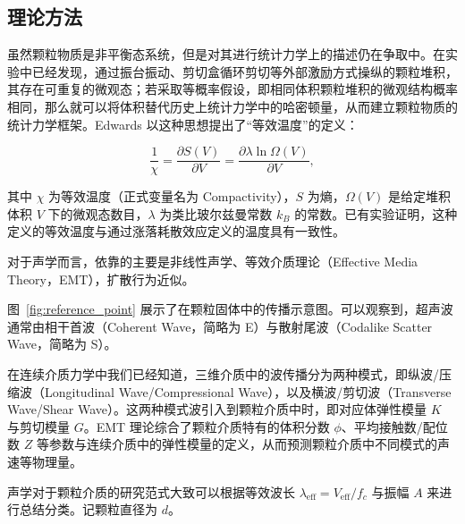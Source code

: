 \subsection{理论方法}

虽然颗粒物质是非平衡态系统，但是对其进行统计力学上的描述仍在争取中。在实验中已经发现，通过振台振动、剪切盒循环剪切等外部激励方式操纵的颗粒堆积，其存在可重复的微观态；若采取等概率假设，即相同体积颗粒堆积的微观结构概率相同，那么就可以将体积替代历史上统计力学中的哈密顿量，从而建立颗粒物质的统计力学框架。Edwards 以这种思想提出了“等效温度”的定义：

\begin{equation}
  \frac{1}{\chi} = \frac{\partial S(V)}{\partial V} = \frac{\partial \lambda\ln{\Omega(V)}}{\partial V},
\end{equation}

其中 $\chi$ 为等效温度（正式变量名为 Compactivity），$S$ 为熵，$\Omega(V)$ 是给定堆积体积 $V$ 下的微观态数目，$\lambda$ 为类比玻尔兹曼常数 $k_{B}$ 的常数。已有实验证明，这种定义的等效温度与通过涨落耗散效应定义的温度具有一致性。


对于声学而言，依靠的主要是非线性声学\cite{10.1029/93JB02974}、等效介质理论（Effective Media Theory，EMT），扩散行为近似。

图~\ref{fig:reference_point} 展示了在颗粒固体中的传播示意图。可以观察到，超声波通常由相干首波（Coherent Wave，简略为 E）与散射尾波（Codalike Scatter Wave，简略为 S）。 %

在连续介质力学中我们已经知道，三维介质中的波传播分为两种模式，即纵波/压缩波（Longitudinal Wave/Compressional Wave），以及横波/剪切波（Transverse Wave/Shear Wave）。这两种模式波引入到颗粒介质中时，即对应体弹性模量 $K$ 与剪切模量 $G$。EMT 理论综合了颗粒介质特有的体积分数 $\phi$、平均接触数/配位数 $Z$ 等参数与连续介质中的弹性模量的定义，从而预测颗粒介质中不同模式的声速等物理量。

声学对于颗粒介质的研究范式大致可以根据等效波长 $\lambda_{\text{eff}} = V_{\text{eff}}/f_{c}$ 与振幅 $A$ 来进行总结分类。记颗粒直径为 $d$。

